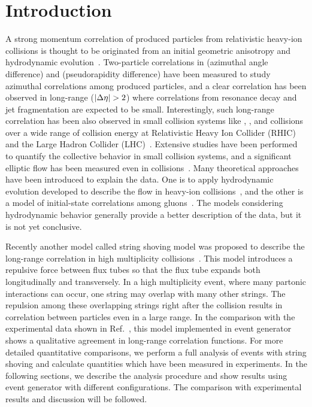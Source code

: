 
\section{Introduction}
\label{sec:intro}

A strong momentum correlation of produced particles from relativistic heavy-ion collisions is thought to be originated from an initial geometric anisotropy and hydrodynamic evolution~\cite{Busza:2018rrf}.
Two-particle correlations in \dphi (azimuthal angle difference) and \deta (pseudorapidity difference) have been measured to study azimuthal correlations among produced particles, and a clear correlation has been observed in long-range ($|\deta|>2$) where correlations from resonance decay and jet fragmentation are expected to be small.
Interestingly, such long-range correlation has been also observed in small collision systems like \pp, \pAu, and \pPb collisions over a wide range of collision energy at Relativistic Heavy Ion Collider (RHIC) and the Large Hadron Collider (LHC)~\cite{Nagle:2018nvi}.
Extensive studies have been performed to quantify the collective behavior in small collision systems, and a significant elliptic flow has been measured even in \pp collisions~\cite{Aad:2015gqa,Khachatryan:2016txc}.
Many theoretical approaches have been introduced to explain the data.
One is to apply hydrodynamic evolution developed to describe the flow in heavy-ion collisions~\cite{Weller:2017tsr}, and the other is a model of initial-state correlations among gluons~\cite{Dumitru:2010iy}.
The models considering hydrodynamic behavior generally provide a better description of the data, but it is not yet conclusive.

Recently another model called string shoving model was proposed to describe the long-range correlation in high multiplicity \pp collisions~\cite{Bierlich:2016vgw}.
This model introduces a repulsive force between flux tubes so that the flux tube expands both longitudinally and transversely.
In a high multiplicity \pp event, where many partonic interactions can occur, one string may overlap with many other strings.
The repulsion among these overlapping strings right after the collision results in correlation between particles even in a large \deta range.
In the comparison with the experimental data shown in Ref.~\cite{Bierlich:2017vhg}, this model implemented in \pythia event generator~\cite{Sjostrand:2007gs} shows a qualitative agreement in long-range correlation functions.
For more detailed quantitative comparisons, we perform a full analysis of \pythia events with string shoving and calculate quantities which have been measured in experiments.
In the following sections, we describe the analysis procedure and show results using \pythia event generator with different configurations.
The comparison with experimental results and discussion will be followed.